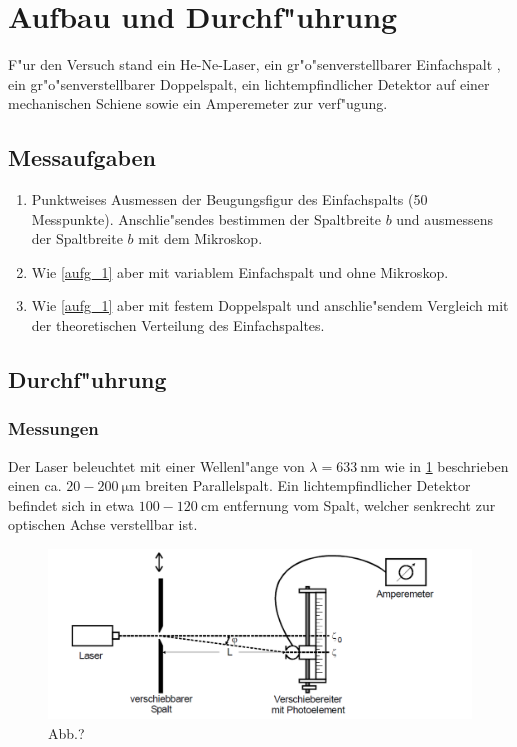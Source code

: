 \section{Aufbau und Durchf"uhrung}
	\label{sec:durchf"uhrung}
	F"ur den Versuch stand ein He-Ne-Laser, ein gr"o"senverstellbarer Einfachspalt , ein gr"o"senverstellbarer Doppelspalt, ein lichtempfindlicher Detektor auf einer mechanischen Schiene sowie ein Amperemeter zur verf"ugung.

	\subsection{Messaufgaben}
		\begin{enumerate}
			\item \label{aufg_1} Punktweises Ausmessen der Beugungsfigur des Einfachspalts (50 Messpunkte). Anschlie"sendes bestimmen der Spaltbreite $b$ und ausmessens der Spaltbreite $b$ mit dem Mikroskop.

			\item \label{aufg_2} Wie \ref{aufg_1} aber mit variablem Einfachspalt und ohne Mikroskop. 

			\item \label{aufg_3} Wie \ref{aufg_1} aber mit festem Doppelspalt und anschlie"sendem Vergleich mit der theoretischen Verteilung des Einfachspaltes.
		\end{enumerate}

	\subsection{Durchf"uhrung}
		\label{sec:durchfuehrung}
		\subsubsection{Messungen}
			\label{sec:messung}

			Der Laser beleuchtet mit einer Wellenl"ange von $\lambda = \SI{633}{\nano \meter}$ wie in \ref{Versuchsaufbau} beschrieben einen ca. $20 - 200 \SI{}{\micro \meter}$ breiten Parallelspalt. Ein lichtempfindlicher Detektor befindet sich in etwa $100 - 120 \SI{}{\centi \meter}$ entfernung vom Spalt, welcher senkrecht zur optischen Achse verstellbar ist.

			\begin{figure}[h]
					\centering
					\includegraphics[width = 14cm]{Versuchsaufbau.png}
					\caption{Abb.?}
					\label{Versuchsaufbau}
			\end{figure}

